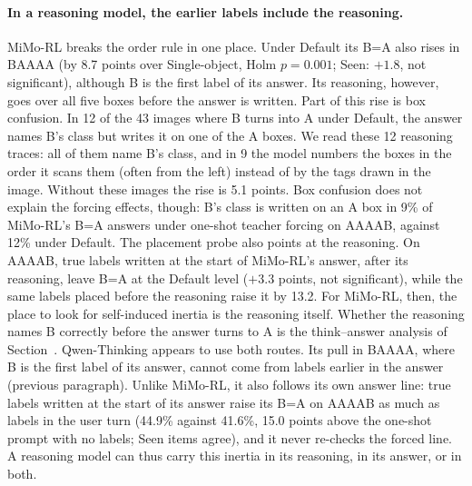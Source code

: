 \paragraph{In a reasoning model, the earlier labels include the reasoning.} MiMo-RL breaks the
order rule in one place. Under Default its B=A also rises in BAAAA (by 8.7 points over Single-object,
Holm $p=0.001$; Seen: $+1.8$, not significant), although B is the first label of its answer. Its
reasoning, however, goes over all five boxes before the answer is written. Part of this rise is box
confusion. In 12 of the 43 images where B turns into A under Default, the answer names B's class but
writes it on one of the A boxes. We read these 12 reasoning traces: all of them name B's class, and
in 9 the model numbers the boxes in the order it scans them (often from the left) instead of by the
tags drawn in the image. Without these images the rise is 5.1 points. Box confusion does not
explain the forcing effects, though: B's class is written on an A box in 9\% of MiMo-RL's B=A
answers under one-shot teacher forcing on AAAAB, against 12\% under Default. The placement probe also
points at the reasoning. On AAAAB, true labels written at the start of MiMo-RL's answer, after its
reasoning, leave B=A at the Default level ($+3.3$ points, not significant), while the same labels
placed before the reasoning raise it by 13.2. For MiMo-RL, then, the place to look for
self-induced inertia is the reasoning itself. Whether the reasoning names B correctly before the
answer turns to A is the think--answer analysis of Section~\tbd. Qwen-Thinking appears to use both routes.
Its pull in BAAAA, where B is the first label of its answer, cannot come from labels earlier in
the answer (previous paragraph). Unlike MiMo-RL, it also follows its own answer line: true labels written at
the start of its answer raise its B=A on AAAAB as much as labels in the user turn (44.9\% against
41.6\%, 15.0 points above the one-shot prompt with no labels; Seen items agree), and it never
re-checks the forced line. A reasoning model can thus carry this inertia in its reasoning, in its answer, or in both.

